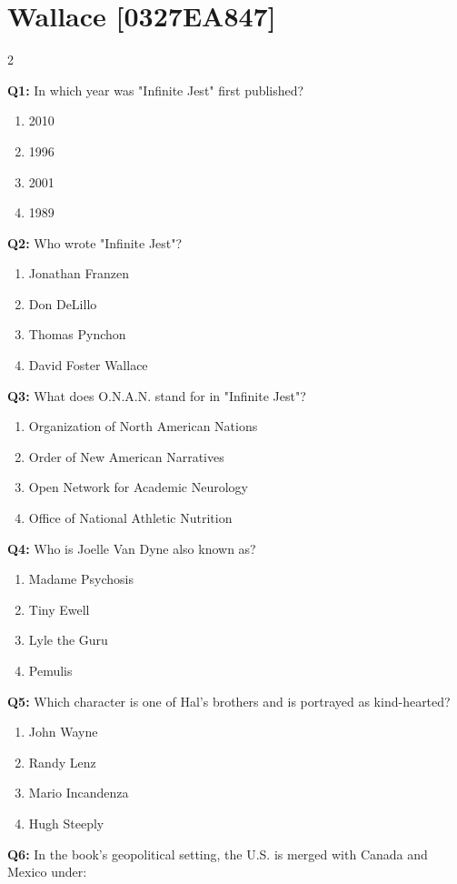 \documentclass[10pt]{article}
\begin{document}
\section*{Wallace \footnotesize [0327EA847]}
\begin{multicols}{2}

\textbf{Q1:} In which year was "Infinite Jest" first published?

\begin{enumerate}[label=\arabic*.]
\item 2010
\item 1996
\item 2001
\item 1989
\end{enumerate}
\textbf{Q2:} Who wrote "Infinite Jest"?

\begin{enumerate}[label=\arabic*.]
\item Jonathan Franzen
\item Don DeLillo
\item Thomas Pynchon
\item David Foster Wallace
\end{enumerate}
\textbf{Q3:} What does O.N.A.N. stand for in "Infinite Jest"?

\begin{enumerate}[label=\arabic*.]
\item Organization of North American Nations
\item Order of New American Narratives
\item Open Network for Academic Neurology
\item Office of National Athletic Nutrition
\end{enumerate}
\textbf{Q4:} Who is Joelle Van Dyne also known as?

\begin{enumerate}[label=\arabic*.]
\item Madame Psychosis
\item Tiny Ewell
\item Lyle the Guru
\item Pemulis
\end{enumerate}
\textbf{Q5:} Which character is one of Hal's brothers and is portrayed as kind-hearted?

\begin{enumerate}[label=\arabic*.]
\item John Wayne
\item Randy Lenz
\item Mario Incandenza
\item Hugh Steeply
\end{enumerate}
\textbf{Q6:} In the book's geopolitical setting, the U.S. is merged with Canada and Mexico under:


\end{multicols}
\end{document}
